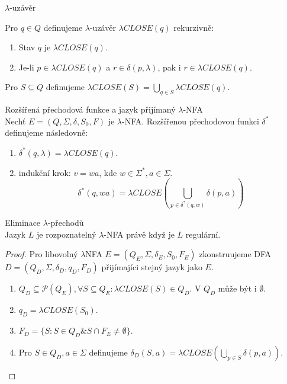 \documentclass[../main.tex]{subfiles}
\begin{document}
\begin{definition}
    $\lambda$-uzávěr

    Pro $q\in Q$ definujeme $\lambda$-uzávěr $\lambda CLOSE(q)$ rekurzivně:
    \begin{enumerate}
        \item Stav $q$ je $\lambda CLOSE(q)$.
        \item Je-li $p \in \lambda CLOSE(q)$ a $r\in \delta(p,\lambda)$, pak i $r \in \lambda CLOSE(q)$.
    \end{enumerate}

    Pro $S \subseteq Q$ definujeme $\lambda CLOSE(S) = \bigcup_{q\in S} \lambda CLOSE(q)$. 
\end{definition}

\begin{definition}
    Rozšířená přechodová funkce a jazyk přijímaný $\lambda$-NFA\\

    Nechť $E = (Q,\Sigma,\delta,S_0,F)$ je $\lambda$-NFA. Rozšířenou přechodovou funkci $\delta^*$ definujeme následovně:
    \begin{enumerate}
        \item $\delta^*(q,\lambda) = \lambda CLOSE(q)$.
        \item indukční krok: $v = wa$, kde $w\in \Sigma^*, a\in \Sigma$.
        \[\delta^*(q,wa) = \lambda CLOSE \left(\bigcup_{p\in \delta^*(q,w)}\delta (p,a)\right)\]
    \end{enumerate}
\end{definition}

\begin{theorem}
    Eliminace $\lambda$-přechodů\\

    Jazyk $L$ je rozpoznatelný $\lambda$-NFA právě když je $L$ regulární.
\end{theorem}

\begin{proof}
    Pro libovolný $\lambda$NFA $E = (Q_E,\Sigma, \delta_E, S_0, F_E)$ zkonstruujeme DFA $D = (Q_D,\Sigma, \delta_D, q_D, F_D)$
    přijímajíci stejný jazyk jako $E$.
    \begin{enumerate}
        \item $Q_D \subseteq \mathcal{P}(Q_E), \forall S \subseteq Q_E : \lambda CLOSE(S) \in Q_D$. V $Q_D$ může být i $\emptyset$.
        \item $q_D = \lambda CLOSE(S_0)$.
        \item $F_D = \{S : S\in Q_D \& S \cap F_E \neq \emptyset\}$.
        \item Pro $S \in Q_D, a\in \Sigma$ definujeme $\delta_D(S,a) = \lambda CLOSE(\bigcup_{p\in S} \delta(p,a))$. 
    \end{enumerate}
\end{proof}
\end{document}
